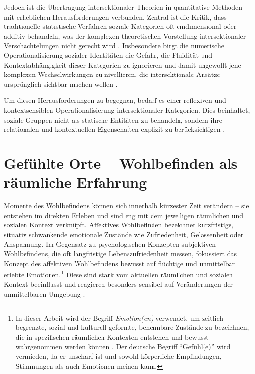 Jedoch ist die Übertragung intersektionaler Theorien in quantitative Methoden mit erheblichen Herausforderungen verbunden. Zentral ist die Kritik, dass traditionelle statistische Verfahren soziale Kategorien oft eindimensional oder additiv behandeln, was der komplexen theoretischen Vorstellung intersektionaler Verschachtelungen nicht gerecht wird \parencite{hancockWhenMultiplicationDoesnt2007, bowlegInvitedReflectionQuantifying2016}. Insbesondere birgt die numerische Operationalisierung sozialer Identitäten die Gefahr, die Fluidität und Kontextabhängigkeit dieser Kategorien zu ignorieren und damit ungewollt jene komplexen Wechselwirkungen zu nivellieren, die intersektionale Ansätze ursprünglich sichtbar machen wollen \parencite{scottIntersectionalityQuantitativeMethods2017}.

Um diesen Herausforderungen zu begegnen, bedarf es einer reflexiven und kontextsensiblen Operationalisierung intersektionaler Kategorien. Dies beinhaltet, soziale Gruppen nicht als statische Entitäten zu behandeln, sondern ihre relationalen und kontextuellen Eigenschaften explizit zu berücksichtigen \parencite{rodo-de-zarateDevelopingGeographiesIntersectionality2014, websterCenteringSocialtechnicalRelations2021}.


\section{Gefühlte Orte -- Wohlbefinden als räumliche Erfahrung} %

Momente des Wohlbefindens können sich innerhalb kürzester Zeit verändern -- sie entstehen im direkten Erleben und sind eng mit dem jeweiligen räumlichen und sozialen Kontext verknüpft. Affektives Wohlbefinden bezeichnet kurzfristige, situativ schwankende emotionale Zustände wie Zufriedenheit, Gelassenheit oder Anspannung. Im Gegensatz zu psychologischen Konzepten subjektiven Wohlbefindens, die oft langfristige Lebenszufriedenheit messen, fokussiert das Konzept des affektiven Wohlbefindens bewusst auf flüchtige und unmittelbar erlebte Emotionen.\footnote{In dieser Arbeit wird der Begriff \emph{Emotion(en)} verwendet, um zeitlich begrenzte, sozial und kulturell geformte, benennbare Zustände zu bezeichnen, die in spezifischen räumlichen Kontexten entstehen und bewusst wahrgenommen werden können \parencite{bondiIntroductionGeographysEmotional2006}. Der deutsche Begriff \enquote{Gefühl(e)} wird vermieden, da er unscharf ist und sowohl körperliche Empfindungen, Stimmungen als auch Emotionen meinen kann.} Diese sind stark vom aktuellen räumlichen und sozialen Kontext beeinflusst und reagieren besonders sensibel auf Veränderungen der unmittelbaren Umgebung \parencite{dodgeChallengeDefiningWellbeing2012}.

